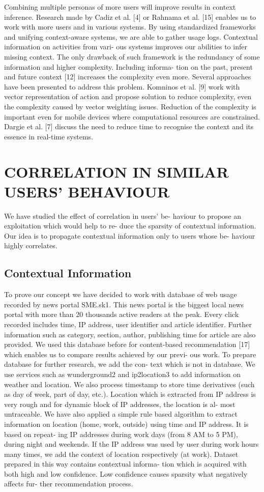 \documentclass{acm_proc_article-sp} %
\begin{document}
Combining multiple personas of more users will improve
results in context inference. Research made by Cadiz et al. [4]
or Rahnama et al. [15] enables us to work with more users
and in various systems. By using standardized frameworks
and unifying context-aware systems, we are able to gather
usage logs. Contextual information on activities from vari-
ous systems improves our abilities to infer missing context.
The only drawback of such framework is the redundancy of
some information and higher complexity. Including informa-
tion on the past, present and future context [12] increases
the complexity even more. Several approaches have been
presented to address this problem. Komninos et al. [9] work
with vector representation of action and propose solution
to reduce complexity, even the complexity caused by vector
weighting issues. Reduction of the complexity is important
even for mobile devices where computational resources are
constrained. Dargie et al. [7] discuss the need to reduce time
to recognise the context and its essence in real-time systems.

\section{CORRELATION IN SIMILAR USERS’ BEHAVIOUR}
We have studied the effect of correlation in users' be-
haviour to propose an exploitation which would help to re-
duce the sparsity of contextual information. Our idea is to
propagate contextual information only to users whose be-
haviour highly correlates.

\subsection{Contextual Information}
To prove our concept we have decided to work with database
of web usage recorded by news portal SME.sk1. This news
portal is the biggest local news portal with more than 20
thousands active readers at the peak. Every click recorded
includes time, IP address, user identifier and article identifier. Further information such as category, section, author, publishing time for article are also provided. We used
this database before for content-based recommendation [17]
which enables us to compare results achieved by our previ-
ous work.
To prepare database for further research, we add the con-
text which is not in database. We use services such as
wunderground2 and ip2location3 to add information on
weather and location. We also process timestamp to store
time derivatives (such as day of week, part of day, etc.).
Location which is extracted from IP address is very rough
and for dynamic block of IP addresses, the location is al-
most untraceable. We have also applied a simple rule based
algorithm to extract information on location (home, work,
outside) using time and IP address. It is based on repeat-
ing IP addresses during work days (from 8 AM to 5 PM),
during night and weekends. If the IP address was used by
user during work hours many times, we add the context of
location respectively (at work).
Dataset prepared in this way contains contextual informa-
tion which is acquired with both high and low confidence.
Low confidence causes sparsity what negatively affects fur-
ther recommendation process.
\end{document}
